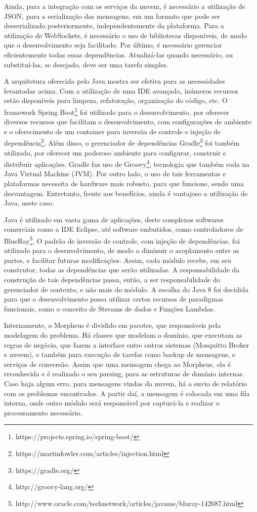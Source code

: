 Ainda, para a integração com os serviços da nuvem, é necessário a utilização de JSON, para a serialização das mensagens, em um formato que pode ser desserializado posteriormente, independentemente da plataforma. Para a utilização de WebSockets, é necessário o uso de bibliotecas disponíveis, de modo que o desenvolvimento seja facilitado. Por último, é necessário gerenciar eficientemente todas essas dependências. Atualizá-las quando necessário, ou substituí-las, se desejado, deve ser uma tarefa simples.

A arquitetura oferecida pelo Java mostra ser efetiva para as necessidades levantadas acima. Com a utilização de uma IDE avançada, inúmeros recursos estão disponíveis para limpeza, refatoração, organização do código, etc. O framework Spring Boot\footnote{https://projects.spring.io/spring-boot/} foi utilizado para o desenvolvimento, por oferecer diversos recursos que facilitam o desenvolvimento, com configurações de ambiente e o oferecimento de um container para inversão de controle e injeção de dependência\footnote{https://martinfowler.com/articles/injection.html}. Além disso, o gerenciador de dependências Gradle\footnote{https://gradle.org/} foi também utilizado, por oferecer um poderoso ambiente para configurar, construir e distribuir aplicações. Gradle faz uso de Groovy\footnote{http://groovy-lang.org/}, tecnologia que também roda na Java Virtual Machine (JVM). Por outro lado, o uso de tais ferramentas e plataformas necessita de hardware mais robusto, para que funcione, sendo uma desvantagem. Entretanto, frente aos benefícios, ainda é vantajoso a utilização de Java, neste caso.

Java é utilizado em vasta gama de aplicações, deste complexos softwares comerciais como a IDE Eclipse, até software embutidos, como controladores de BlueRay\footnote{http://www.oracle.com/technetwork/articles/javame/bluray-142687.html}. 
O padrão de inversão de controle, com injeção de dependências, foi utilizado para o desenvolvimento, de modo a diminuir o acoplamento entre as partes, e facilitar futuras modificações. Assim, cada módulo recebe, em seu construtor, todas as dependências que serão utilizadas. A responsabilidade da construção de tais dependências passa, então, a ser responsabilidade do gerenciador de contexto, e não mais do módulo. A escolha do Java 8 foi decidida para que o desenvolvimento possa utilizar certos recursos de paradigmas funcionais, como o conceito de Streams de dados e Funções Lambdas.

Internamente, o Morpheus é dividido em pacotes, que responsáveis pela modelagem do problema. Há classes que modelam o domínio, que executam as regras de negócio, que fazem a interface entre outros sistemas (\wmqtt Mosquitto Broker e nuvem), e também para execução de tarefas como backup de mensagens, e serviços de conversão.
Assim que uma mensagem chega ao Morpheus, ela é reconhecida e é realizado o seu parsing, para as estruturas de domínio internas. Caso haja algum erro, para mensagens vindas da nuvem, há o envio de relatório com os problemas encontrados. A partir daí, a mensagem é colocada em uma fila interna, onde outro módulo será responsável por capturá-la e realizar o processamento necessário.

